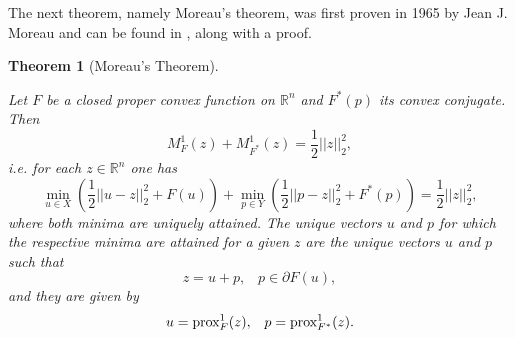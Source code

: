 \documentclass[abstracton]{scrreprt}
\newtheorem{theorem}{Theorem}[chapter]
\begin{document}
        The next theorem, namely Moreau's theorem, was first proven in 1965 by Jean J. Moreau and can be found in \cite{Rockafellar}, along with a proof.
        \begin{theorem}[Moreau's Theorem] %
        \label{the:moreau_identity}

            Let $F$ be a closed proper convex function on $\mathbb{R}^{n}$ and $F^{\ast}(p)$ its convex conjugate. Then
                $$
                    M^{1}_{F}(z) + M^{1}_{F^{\ast}}(z) = \frac{1}{2}||z||_{2}^{2},
                $$
            i.e. for each $z \in \mathbb{R}^{n}$ one has
                $$
                    \min_{u \in X} \left( \frac{1}{2} ||u - z||_{2}^{2} + F(u) \right) + \min_{p \in Y} \left( \frac{1}{2} ||p - z||_{2}^{2} + F^{\ast}(p) \right) = \frac{1}{2}||z||_{2}^{2},
                $$
            where both minima are uniquely attained. The unique vectors $u$ and $p$ for which the respective minima are attained for a given $z$ are the unique vectors $u$ and $p$ such that
                \begin{equation}
                    z = u + p, \,\,\,\,\, p \in \partial F(u),
                    \label{eq:equivalence_of_moreau_property}
                \end{equation}
            and they are given by
                \begin{equation}
                    u = \textnormal{prox}^{1}_{F}(z), \,\,\,\,\, p = \textnormal{prox}^{1}_{F^{\ast}}(z).
                    \label{eq:prox_z}
                \end{equation}
        \end{theorem}
\end{document}
